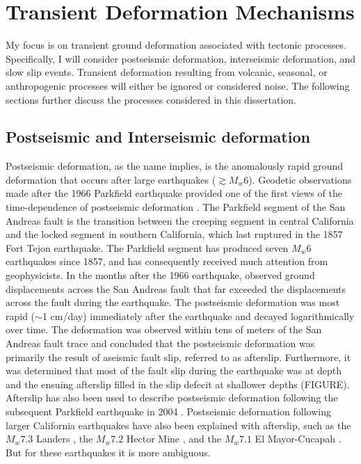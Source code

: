 \section{Transient Deformation Mechanisms}
My focus is on transient ground deformation associated with tectonic
processes. Specifically, I will consider postseismic deformation,
interseismic deformation, and slow slip events. Transient deformation
resulting from volcanic, seasonal, or anthropogenic processes will
either be ignored or considered noise. The following sections further
discuss the processes considered in this dissertation.

\subsection{Postseismic and Interseismic deformation}

Postseismic deformation, as the name implies, is the anomalously rapid
ground deformation that occurs after large earthquakes
(${\gtrsim}M_w6$). Geodetic observations made after the 1966 Parkfield
earthquake provided one of the first views of the time-dependence of
postseismic deformation \citep{Smith1968}. The Parkfield segment of
the San Andreas fault is the transition between the creeping segment
in central California and the locked segment in southern California,
which last ruptured in the 1857 Fort Tejon earthquake. The Parkfield
segment has produced seven $M_w6$ earthquakes since 1857, and has
consequently received much attention from geophysicists. In the months
after the 1966 earthquake, \citet{Smith1968} observed ground
displacements across the San Andreas fault that far exceeded the
displacements across the fault during the earthquake. The postseismic
deformation was most rapid (${\sim}$1 cm/day) immediately after the
earthquake and decayed logarithmically over time. The deformation was
observed within tens of meters of the San Andreas fault trace and
\citet{Smith1968} concluded that the postseismic deformation was
primarily the result of aseismic fault slip, referred to as afterslip.
Furthermore, it was determined that most of the fault slip during the
earthquake was at depth and the ensuing afterslip filled in the slip
defecit at shallower depths (FIGURE). Afterslip has also been used to
describe postseismic deformation following the subsequent Parkfield
earthquake in 2004 \citep{Freed2007}. Postseismic deformation
following larger California earthquakes have also been explained with
afterslip, such as the $M_w7.3$ Landers \citep{Shen1994}, the $M_w7.2$
Hector Mine \citep{Jacobs2002}, and the $M_w7.1$ El Mayor-Cucapah
\citep{Gonzalez-ortega2014}. But for these earthquakes it is more
ambiguous.

